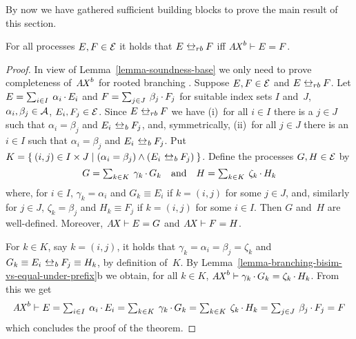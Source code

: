 \noindent
By now we have gathered sufficient building blocks to prove the main
result of this section.

\begin{theorem}
  \label{theorem-completeness}
  For all processes $E, F \in \mathcal{E}$ it holds that $E \rootedbrbisim
  F$ iff $\mathit{A \mkern-2mu X}^b \vdash E = F$.
\end{theorem}

\begin{proof}
  In view of Lemma~\ref{lemma-soundness-base} we only need to prove
  completeness of~$\mathit{A \mkern-2mu X}^b$ for rooted branching
  {\bisimilarity}. Suppose $E, F \in \mathcal{E}$ and $E \rootedbrbisim
  F$. Let $E = \textstyle\sum_{i {\in} I} \: \alpha_i \mathop{.} E_i$ and $F= \textstyle\sum_{j {\in} J} \:
  \beta_j \mathop{.} F_j$ for suitable index sets $I$ and~$J$, $\alpha_i,
  \beta_j \in \mathcal{A}$, $E_i, F_j \in \mathcal{E}$. Since $E \rootedbrbisim F$
  we have (i)~for all $i \in I$ there is a $j \in J$ such that
  $\alpha_i = \beta_j $ and $E_i \brbisim F_j$, and, symmetrically,
  (ii)~for all $j \in J$ there is an $i \in I$ such that $\alpha_i =
  \beta_j$ and $E_i \brbisim F_j$.  Put $K = \lc (i,j) \in I \times J
  \mid ( \alpha_i = \beta_j ) \land ( E_i \brbisim F_j ) \rc$. Define
  the processes $G, H \in \mathcal{E}$ by
  \begin{displaymath}
    G = \textstyle\sum_{k {\in} K} \: \gamma_k \mathop{.} G_k
    \quad \text{and} \quad
    H = \textstyle\sum_{k {\in} K} \: \zeta_k \mathop{.} H_k
  \end{displaymath}
  where, for $i \in I$, $\gamma_k = \alpha_i$ and $G_k \equiv E_i$ if
  $k = (i,j)$ for some $j \in J$, and, similarly for $j \in J$,
  $\zeta_k = \beta_j$ and $H_k \equiv F_j$ if $k = (i,j)$ for some $i
  \in I$. Then $G$ and~$H$ are well-defined. Moreover, $\mathit{A \mkern-2mu X} \vdash E
  = G$ and $\mathit{A \mkern-2mu X} \vdash F = H$.

  For $k \in K$, say $k = (i,j)$, it holds that $\gamma_k = \alpha_i =
  \beta_j = \zeta_k$ and $G_k \equiv E_i \brbisim F_j \equiv H_k$, by
  definition of~$K$. By
  Lemma~\ref{lemma-branching-bisim-vs-equal-under-prefix}b we obtain,
  for all $k \in K$, $\mathit{A \mkern-2mu X}^b \vdash { \gamma_k \mathop{.}G_k = \zeta_k
    \mathop{.}H_k }$. From this we get
  \begin{displaymath}
    \mathit{A \mkern-2mu X}^b \vdash E 
    = \textstyle\sum_{i {\in} I} \: \alpha_i \mathop{.} E_i
    = \textstyle\sum_{k {\in} K} \: \gamma_k \mathop{.} G_k
    = \textstyle\sum_{k {\in} K} \: \zeta_k \mathop{.} H_k
    = \textstyle\sum_{j {\in} J} \: \beta_j \mathop{.} F_j
    = F
  \end{displaymath}
  which concludes the proof of the theorem.
\end{proof}
